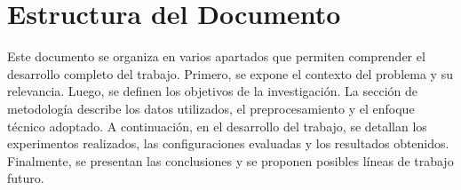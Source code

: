 \section{Estructura del Documento}

Este documento se organiza en varios apartados que permiten 
comprender el desarrollo completo del trabajo. Primero, se 
expone el contexto del problema y su relevancia. Luego, se 
definen los objetivos de la investigación. La sección de 
metodología describe los datos utilizados, el preprocesamiento 
y el enfoque técnico adoptado. A continuación, en el desarrollo 
del trabajo, se detallan los experimentos realizados, las 
configuraciones evaluadas y los resultados obtenidos. Finalmente, 
se presentan las conclusiones y se proponen posibles líneas de 
trabajo futuro.
